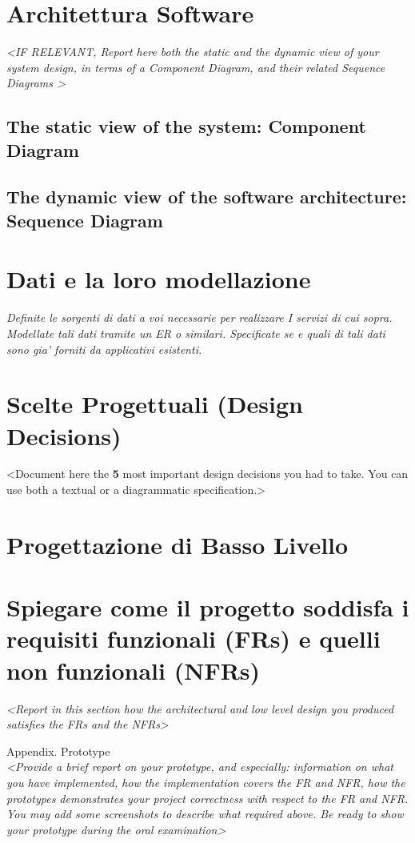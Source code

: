 \newpage
\section{Architettura Software}
\emph{\textless IF RELEVANT, Report here both the static and the dynamic
  view of your system design, in terms of a Component Diagram, and their
related Sequence Diagrams \textgreater{}}

\subsection{The static view of the system: Component Diagram}

\subsection{The dynamic view of the software architecture:
Sequence Diagram}

\newpage
\section{Dati e la loro modellazione}

\emph{Definite le sorgenti di dati a voi necessarie per realizzare I
  servizi di cui sopra. Modellate tali dati tramite un ER o similari.
  Specificate se e quali di tali dati sono gia' forniti da applicativi
esistenti.}

\newpage
\section{Scelte Progettuali (Design Decisions)}
\textless Document here the \textbf{5} most important design decisions
you had to take. You can use both a textual or a diagrammatic
specification.\textgreater{}

\newpage
\section{Progettazione di Basso Livello}

\newpage
\section{Spiegare come il progetto soddisfa i requisiti funzionali (FRs) e
quelli non funzionali (NFRs)}
\emph{\textless Report in this section how
  the architectural and low level design you produced satisfies the FRs
and the NFRs\textgreater{}}

Appendix. Prototype\\
\emph{\textless Provide
  a brief report on your prototype, and especially: information on what
  you have implemented, how the implementation covers the FR and NFR, how
  the prototypes demonstrates your project correctness with respect to the
  FR and NFR. You may add some screenshots to describe what required
  above. Be ready to show your prototype during the oral
examination\textgreater{}}

